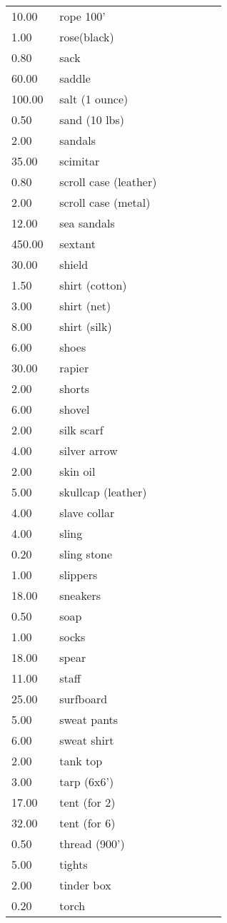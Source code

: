 \begin{tcolorbox}[breakable,boxrule=0pt,title=\textbf{Equipment Costs}]
\begin{xtabular}{@{}p{0.2\linewidth} p{0.7\linewidth}}
10.00 & rope 100'\\
1.00 & rose(black)\\
0.80 & sack\\
60.00 & saddle\\
100.00 & salt (1 ounce)\\
0.50 & sand (10 lbs)\\
2.00 & sandals\\
35.00 & scimitar\\
0.80 & scroll case (leather)\\
2.00 & scroll case (metal)\\
12.00 & sea sandals\\
450.00 & sextant\\
30.00 & shield\\
1.50 & shirt (cotton)\\
3.00 & shirt (net)\\
8.00 & shirt (silk)\\
6.00 & shoes\\
30.00 & rapier\\
2.00 & shorts\\
6.00 & shovel\\
2.00 & silk scarf\\
4.00 & silver arrow\\
2.00 & skin oil\\
5.00 & skullcap (leather)\\
4.00 & slave collar\\
4.00 & sling\\
0.20 & sling stone\\
1.00 & slippers\\
18.00 & sneakers\\
0.50 & soap\\
1.00 & socks\\
18.00 & spear\\
11.00 & staff\\
25.00 & surfboard\\
5.00 & sweat pants\\
6.00 & sweat shirt\\
2.00 & tank top\\
3.00 & tarp (6x6')\\
17.00 & tent (for 2)\\
32.00 & tent (for 6)\\
0.50 & thread (900')\\
5.00 & tights\\
2.00 & tinder box\\
0.20 & torch\\

\end{xtabular}
\end{tcolorbox}
